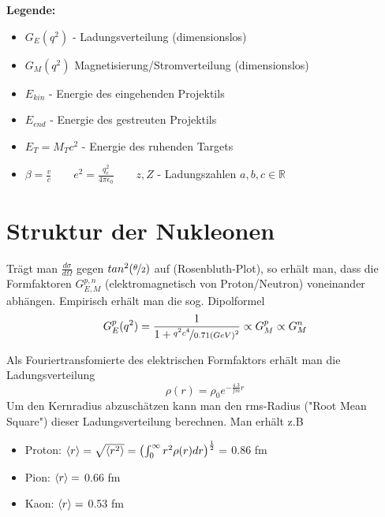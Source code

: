\documentclass[Ex4_Zusammenfassung.tex]{subfiles}
\begin{document}
\textbf{Legende:} 
\begin{itemize} 
\item $G_E(q^2)$ - Ladungsverteilung (dimensionslos)
\item $G_M(q^2)$ Magnetisierung/Stromverteilung (dimensionslos)
\item $E_{kin}$ - Energie des eingehenden Projektils 
\item $E_ {end}$ - Energie des gestreuten Projektils
\item $E_T = M_T c^2$ - Energie des ruhenden Targets 
\item $\beta = \frac{v}{c} \qquad e^2=\frac{q_e^2}{4\pi \epsilon_0} \qquad z,Z$ - Ladungszahlen \qquad $a,b,c \in \mathbb{R}$
\end{itemize}
\section*{Struktur der Nukleonen}
Trägt man $\frac{d\sigma}{d\Omega}$ gegen $tan^2(\nicefrac{\theta}{2})$ auf (Rosenbluth-Plot), so erhält man, dass die Formfaktoren $G_{E,M}^{p,n}$ (elektromagnetisch von Proton/Neutron) voneinander abhängen. Empirisch erhält man die sog. Dipolformel
\begin{equation}
G_E^p(q^2) = \frac{1}{1+ \nicefrac{q^2c^4}{0.71 (GeV)^2}} \propto G_M^p \propto G_M^n
\end{equation}
\begin{figure}[H]
\centering
{}
\end{figure}
Als Fouriertransfomierte des elektrischen Formfaktors erhält man die Ladungsverteilung
\begin{equation}
\rho(r) = \rho_0  e^{-\frac{4.3}{fm} r}
\end{equation}
Um den Kernradius abzuschätzen kann man den rms-Radius ("Root Mean Square") dieser Ladungsverteilung berechnen. Man erhält z.B 
\begin{itemize}
\item Proton: $\braket{r} = \sqrt{\braket{r^2}} = \left( \int_0^{\infty} r^2 \rho(r) dr \right)^{\frac{1}{2}} =$ 0.86 fm
\item Pion: $\braket{r} =$ 0.66 fm 
\item Kaon: $\braket{r} =$ 0.53 fm 
\end{itemize}
\end{document}
